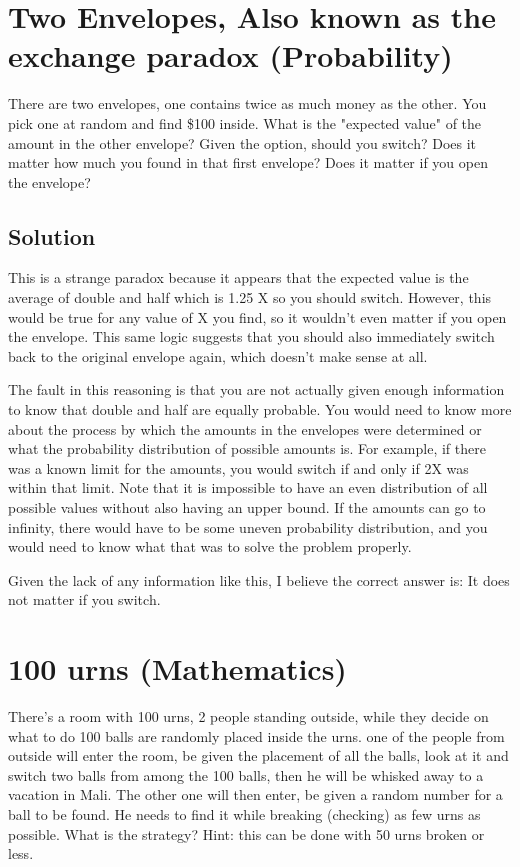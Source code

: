 \documentclass{article}
\begin{document}
\section{Two Envelopes, Also known as the exchange paradox (Probability)}
There are two envelopes, one contains twice as much money as the other. You pick one at random and find \$100 inside. What is the "expected value" of the amount in the other envelope? Given the option, should you switch? Does it matter how much you found in that first envelope? Does it matter if you open the envelope?

\subsection{Solution}
This is a strange paradox because it appears that the expected value is the average of double and half which is 1.25 X so you should switch. However, this would be true for any value of X you find, so it wouldn't even matter if you open the envelope. This same logic suggests that you should also immediately switch back to the original envelope again, which doesn't make sense at all.

The fault in this reasoning is that you are not actually given enough information to know that double and half are equally probable. You would need to know more about the process by which the amounts in the envelopes were determined or what the probability distribution of possible amounts is. For example, if there was a known limit for the amounts, you would switch if and only if 2X was within that limit. Note that it is impossible to have an even distribution of all possible values without also having an upper bound. If the amounts can go to infinity, there would have to be some uneven probability distribution, and you would need to know what that was to solve the problem properly.

Given the lack of any information like this, I believe the correct answer is: It does not matter if you switch.

\section{100 urns (Mathematics)}
There's a room with 100 urns, 2 people standing outside, while they decide on what to do 100 balls are randomly placed inside the urns. one of the people from outside will enter the room, be given the placement of all the balls, look at it and switch two balls from among the 100 balls, then he will be whisked away to a vacation in Mali. The other one will then enter, be given a random number for a ball to be found. He needs to find it while breaking (checking) as few urns as possible. What is the strategy?
Hint: this can be done with 50 urns broken or less.
\end{document}
